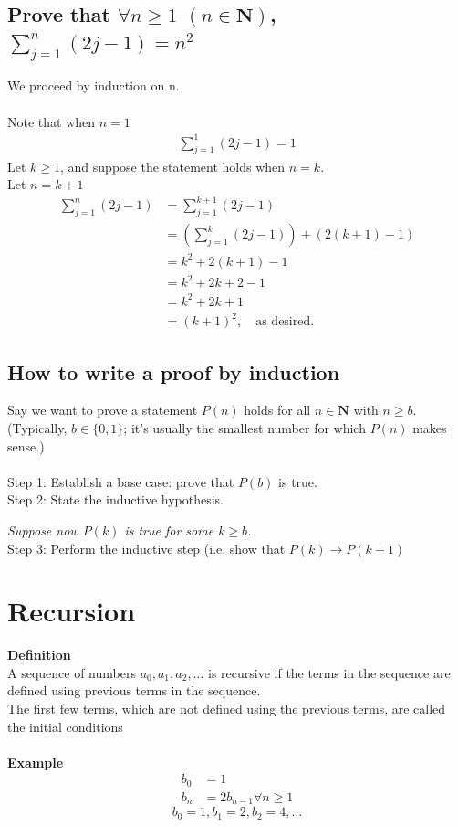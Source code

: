 \documentclass[12pt]{article}
\begin{document}
	\subsection{Prove that $\forall n \geq 1$  $(n \in \mathbf{N})$, $\sum_{j = 1}^{n} (2j - 1) = n^2$}
	We proceed by induction on n.\\\\
	Note that when $n = 1$
	\begin{align*}
		\sum_{j = 1}^{1} (2j - 1) = 1
	\end{align*}
	Let $k \geq 1$, and suppose the statement holds when $n = k$. \\
	Let $n = k + 1 $
	\begin{align*}
		\sum_{j = 1}^{n} (2j - 1) &= \sum_{j = 1}^{k + 1} (2j - 1) \\
						   &= \left(\sum_{j = 1}^{k} (2j - 1)\right) + (2(k + 1) - 1)\\
						   &= k^2 + 2(k + 1) - 1 \\
						   &= k^2 + 2k + 2 - 1 \\
						   &= k^2 + 2k + 1 \\
						   &= (k + 1)^2,\quad \text{as desired.}
	\end{align*}
	\subsection{How to write a proof by induction}
	Say we want to prove a statement $P(n)$ holds for all $n \in \mathbf{N}$ with $n \geq b$. (Typically, $b \in \{0, 1\}$; it's usually the smallest number for which $P(n)$ makes sense.) \\\\
	Step 1: Establish a base case: prove that $P(b)$ is true. \\
	Step 2: State the inductive hypothesis.

	\textit{Suppose now $P(k)$ is true for some $k \geq b$.} \\
	Step 3: Perform the inductive step (i.e. show that $P(k) \rightarrow P(k + 1)$
	\section{Recursion}
	\textbf{Definition}\\
	A sequence of numbers $a_0, a_1, a_2, \ldots$ is recursive if the terms in the sequence are defined using previous terms in the sequence. \\
	The first few terms, which are not defined using the previous terms, are called the initial conditions\\\\
	\textbf{Example}\\
	\begin{align*}
		b_0 &= 1 \\
		b_n &= 2b_{n - 1} \forall n \geq 1
	\end{align*}
	$$b_0 = 1, b_1 = 2, b_2 = 4, \ldots $$
\end{document}
